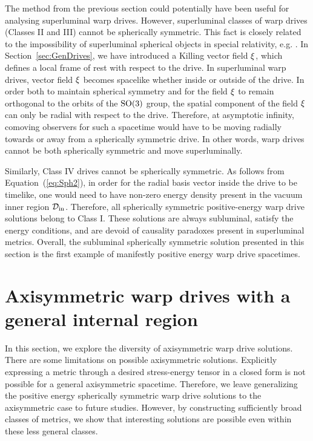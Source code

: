 \documentclass[10pt]{iopart}
\begin{document}
The method from the previous section could potentially have been useful for analysing superluminal warp drives. However,  superluminal classes of warp drives (Classes II and III) cannot be spherically symmetric. This fact is closely related to the impossibility of superluminal spherical objects in special relativity, e.g. \cite{Fayngold2002}. In Section~\ref{sec:GenDrives}, we have introduced a Killing vector field ${\bf \xi}$, which defines a local frame of rest with respect to the drive. In superluminal warp drives, vector field ${\bf \xi}$ becomes spacelike whether inside or outside of the drive. In order both to maintain spherical symmetry and for the field ${\bf \xi}$ to remain orthogonal to the orbits of the ${\rm SO}(3)$ group, the spatial component of the field ${\bf \xi}$ can only be radial with respect to the drive. Therefore, at asymptotic infinity, comoving observers for such a spacetime would have to be moving radially towards or away from a spherically symmetric drive. In other words, warp drives cannot be both spherically symmetric and move superluminally.

Similarly, Class IV drives cannot be spherically symmetric. As follows from Equation~(\ref{eq:Sph2}), in order for the radial basis vector inside the drive to be timelike, one would need to have non-zero energy density present in the vacuum inner region $\mathcal{D}_{\rm in}$. Therefore, all spherically symmetric positive-energy warp drive solutions belong to Class I. These solutions are always subluminal, satisfy the energy conditions, and are devoid of causality paradoxes present in superluminal metrics. Overall, the subluminal spherically symmetric solution presented in this section is the first example of manifestly positive energy warp drive spacetimes.

\section{Axisymmetric warp drives with a general internal region}
\label{sec:Axi}

In this section, we explore the diversity of axisymmetric warp drive solutions. There are some limitations on possible axisymmetric solutions. Explicitly expressing a metric through a desired stress-energy tensor in a closed form is not possible for a general axisymmetric spacetime. Therefore, we leave generalizing the positive energy spherically symmetric warp drive solutions to the axisymmetric case to future studies. However, by constructing sufficiently broad classes of metrics, we show that interesting solutions are possible even within these less general classes. 
\end{document}
